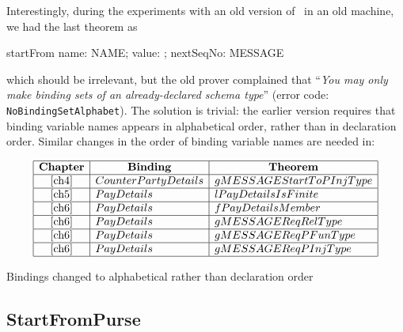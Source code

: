 %
Interestingly, during the experiments with an old version of \zeves\ in an old machine,
we had the last theorem as
%
\begin{gzed}
  startFrom \in \lblot name: NAME; value: \nat; nextSeqNo: \nat \rblot \pinj MESSAGE
\end{gzed}
%
which should be irrelevant, but the old prover complained that ``\textit{You may only make binding sets of an already-declared schema type}''
(error code: \texttt{NoBindingSetAlphabet}). The solution is trivial: the earlier version requires that
binding variable names appears in alphabetical order, rather than in declaration order.
Similar changes in the order of binding variable names are needed in:
%
\begin{table}[ht]
\[
\begin{array}{|c|l|l|}
    \hline
    \multicolumn{1}{|c}{\mbox{\textbf{Chapter}}} & \multicolumn{1}{|c}{\mbox{\textbf{Binding}}} & \multicolumn{1}{|c|}{\mbox{\textbf{Theorem}}} \\
    \hline
    \ref{ch4}               & CounterPartyDetails     & gMESSAGEStartToPInjType \\
    \hline
    \ref{ch5}               & PayDetails              & lPayDetailsIsFinite \\
    \hline
    \ref{ch6}               & PayDetails              & fPayDetailsMember \\
    \hline
    \ref{ch6}               & PayDetails              & gMESSAGEReqRelType \\
    \hline
    \ref{ch6}               & PayDetails              & gMESSAGEReqPFunType \\
    \hline
    \ref{ch6}               & PayDetails              & gMESSAGEReqPInjType \\
    \hline
\end{array}
\]
\caption{Bindings changed to alphabetical rather than declaration order}
\end{table}

\subsection{StartFromPurse}\label{ch4.valTransferOp.StartFromPurse}

